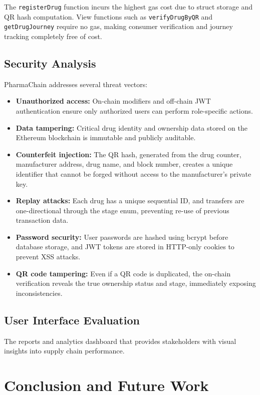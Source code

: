 \documentclass[conference]{IEEEtran}
\begin{document}
The \texttt{registerDrug} function incurs the highest gas cost due to struct storage and QR hash computation. View functions such as \texttt{verifyDrugByQR} and \texttt{getDrugJourney} require no gas, making consumer verification and journey tracking completely free of cost.

\subsection{Security Analysis}

PharmaChain addresses several threat vectors:

\begin{itemize}
\item \textbf{Unauthorized access:} On-chain modifiers and off-chain JWT authentication ensure only authorized users can perform role-specific actions.
\item \textbf{Data tampering:} Critical drug identity and ownership data stored on the Ethereum blockchain is immutable and publicly auditable.
\item \textbf{Counterfeit injection:} The QR hash, generated from the drug counter, manufacturer address, drug name, and block number, creates a unique identifier that cannot be forged without access to the manufacturer's private key.
\item \textbf{Replay attacks:} Each drug has a unique sequential ID, and transfers are one-directional through the stage enum, preventing re-use of previous transaction data.
\item \textbf{Password security:} User passwords are hashed using bcrypt before database storage, and JWT tokens are stored in HTTP-only cookies to prevent XSS attacks.
\item \textbf{QR code tampering:} Even if a QR code is duplicated, the on-chain verification reveals the true ownership status and stage, immediately exposing inconsistencies.
\end{itemize}

\subsection{User Interface Evaluation}

The reports and analytics dashboard that provides stakeholders with visual insights into supply chain performance.


\section{Conclusion and Future Work}
\end{document}
